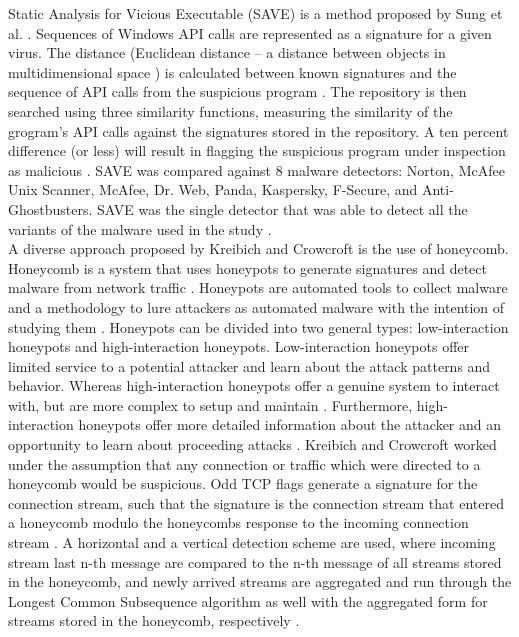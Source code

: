 \documentclass[12pt]{article} %
\begin{document}
Static Analysis for Vicious Executable (SAVE) is a method proposed by Sung et al. \cite{idika2007survey}. Sequences of Windows API calls are represented as a signature for a given virus. The distance (Euclidean distance – a distance between objects in multidimensional space \cite{deza2009encyclopedia, clusteranalysis}) is calculated between known signatures and the sequence of API calls from the suspicious program \cite{idika2007survey}. The repository is then searched using three similarity functions, measuring the similarity of the grogram’s API calls against the signatures stored in the repository. A ten percent difference (or less) will result in flagging the suspicious program under inspection as malicious \cite{idika2007survey}. SAVE was compared against 8 malware detectors: Norton, McAfee Unix Scanner, McAfee, Dr. Web, Panda, Kaspersky, F-Secure, and Anti-Ghostbusters. SAVE was the single detector that was able to detect all the variants of the malware used in the study \cite{idika2007survey}.\\
A diverse approach proposed by Kreibich and Crowcroft \cite{idika2007survey} is the use of honeycomb. Honeycomb is a system that uses honeypots to generate signatures and detect malware from network traffic \cite{idika2007survey}. Honeypots are automated tools to collect malware and a methodology to lure attackers as automated malware with the intention of studying them \cite{baecher2006nepenthes}. Honeypots can be divided into two general types: low-interaction honeypots and high-interaction honeypots. Low-interaction honeypots offer limited service to a potential attacker and learn about the attack patterns and behavior. Whereas high-interaction honeypots offer a genuine system to interact with, but are more complex to setup and maintain \cite{baecher2006nepenthes}. Furthermore, high-interaction honeypots offer more detailed information about the attacker and an opportunity to learn about proceeding attacks \cite{baecher2006nepenthes}. Kreibich and Crowcroft \cite{idika2007survey} worked under the assumption that any connection or traffic which were directed to a honeycomb would be suspicious. Odd TCP flags generate a signature for the connection stream, such that the signature is the connection stream that entered a honeycomb modulo the honeycombs response to the incoming connection stream \cite{idika2007survey}. A horizontal and a vertical detection scheme are used, where incoming stream last n-th message are compared to the n-th message of all streams stored in the honeycomb, and newly arrived streams are aggregated and run through the Longest Common Subsequence algorithm as well with the aggregated form for streams stored in the honeycomb, respectively \cite{idika2007survey}. \\ \\
\end{document}
